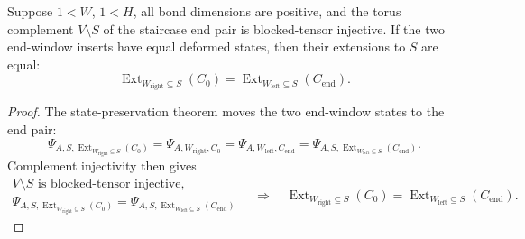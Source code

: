\begin{theorem}
    \label{thm:peps_staircase_pair_insert_eq_complement_injective}
    \leanok
    Suppose $1<W$, $1<H$, all bond dimensions are positive, and the torus
    complement $V\setminus S$ of the staircase end pair is blocked-tensor
    injective.  If the two end-window inserts have equal deformed states, then
    their extensions to $S$ are equal:
    \[
        \operatorname{Ext}_{W_{\mathrm{right}}\subseteq S}(C_0)
        =
        \operatorname{Ext}_{W_{\mathrm{left}}\subseteq S}(C_{\mathrm{end}}).
    \]
\end{theorem}
\begin{proof}
    \leanok
    The state-preservation theorem moves the two end-window states to the end
    pair:
    \[
        \Psi_{A,S,\operatorname{Ext}_{W_{\mathrm{right}}\subseteq S}(C_0)}
        =
        \Psi_{A,W_{\mathrm{right}},C_0}
        =
        \Psi_{A,W_{\mathrm{left}},C_{\mathrm{end}}}
        =
        \Psi_{A,S,\operatorname{Ext}_{W_{\mathrm{left}}\subseteq S}(C_{\mathrm{end}})}.
    \]
    Complement injectivity then gives
    \[
        \begin{gathered}
        V\setminus S\text{ is blocked-tensor injective},\\
        \Psi_{A,S,\operatorname{Ext}_{W_{\mathrm{right}}\subseteq S}(C_0)}
        =
        \Psi_{A,S,\operatorname{Ext}_{W_{\mathrm{left}}\subseteq S}(C_{\mathrm{end}})}
        \end{gathered}
        \quad\Longrightarrow\quad
        \operatorname{Ext}_{W_{\mathrm{right}}\subseteq S}(C_0)
        =
        \operatorname{Ext}_{W_{\mathrm{left}}\subseteq S}(C_{\mathrm{end}}).
    \]
\end{proof}

